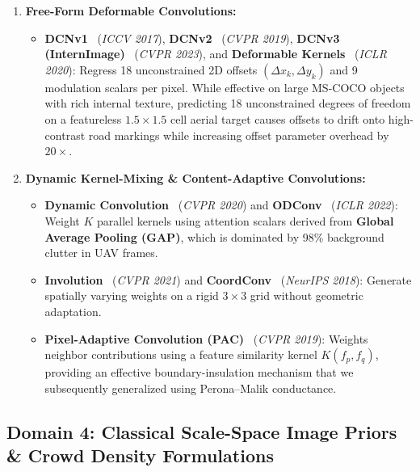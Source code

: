 \documentclass[11pt,a4paper]{article}
\begin{document}
\begin{enumerate}[leftmargin=1.6em]
    \item \textbf{Free-Form Deformable Convolutions:}
    \begin{itemize}[leftmargin=1.2em]
        \item \textbf{DCNv1}~\cite{dai2017dcnv1} (\emph{ICCV 2017}), \textbf{DCNv2}~\cite{zhu2019dcnv2} (\emph{CVPR 2019}), \textbf{DCNv3 (InternImage)}~\cite{wang2023internimage} (\emph{CVPR 2023}), and \textbf{Deformable Kernels}~\cite{gao2020deformablekernels} (\emph{ICLR 2020}): Regress 18 unconstrained 2D offsets $(\Delta x_k, \Delta y_k)$ and 9 modulation scalars per pixel. While effective on large MS-COCO objects with rich internal texture, predicting 18 unconstrained degrees of freedom on a featureless $1.5\times 1.5$ cell aerial target causes offsets to drift onto high-contrast road markings while increasing offset parameter overhead by $20\times$.
    \end{itemize}

    \item \textbf{Dynamic Kernel-Mixing \& Content-Adaptive Convolutions:}
    \begin{itemize}[leftmargin=1.2em]
        \item \textbf{Dynamic Convolution}~\cite{chen2020dynamic} (\emph{CVPR 2020}) and \textbf{ODConv}~\cite{li2022odconv} (\emph{ICLR 2022}): Weight $K$ parallel kernels using attention scalars derived from \textbf{Global Average Pooling (GAP)}, which is dominated by 98\% background clutter in UAV frames.
        \item \textbf{Involution}~\cite{li2021involution} (\emph{CVPR 2021}) and \textbf{CoordConv}~\cite{liu2018coordconv} (\emph{NeurIPS 2018}): Generate spatially varying weights on a rigid $3\times 3$ grid without geometric adaptation.
        \item \textbf{Pixel-Adaptive Convolution (PAC)}~\cite{su2019pac} (\emph{CVPR 2019}): Weights neighbor contributions using a feature similarity kernel $K(f_p, f_q)$, providing an effective boundary-insulation mechanism that we subsequently generalized using Perona--Malik conductance.
    \end{itemize}
\end{enumerate}

\subsection{Domain 4: Classical Scale-Space Image Priors \& Crowd Density Formulations}
\end{document}
